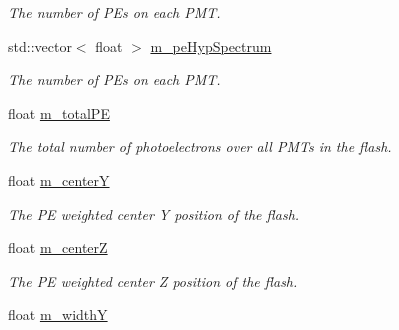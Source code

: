 \begin{DoxyCompactItemize}
\begin{DoxyCompactList}\small\item\em The number of P\-Es on each P\-M\-T. \end{DoxyCompactList}\item 
\hypertarget{classflashmatch_1_1FlashMatchingTool_1_1FlashCandidate_a3ecf14f425f49452494ece572ef97927}{std\-::vector$<$ float $>$ \hyperlink{classflashmatch_1_1FlashMatchingTool_1_1FlashCandidate_a3ecf14f425f49452494ece572ef97927}{m\-\_\-pe\-Hyp\-Spectrum}}\label{classflashmatch_1_1FlashMatchingTool_1_1FlashCandidate_a3ecf14f425f49452494ece572ef97927}

\begin{DoxyCompactList}\small\item\em The number of P\-Es on each P\-M\-T. \end{DoxyCompactList}\item 
\hypertarget{classflashmatch_1_1FlashMatchingTool_1_1FlashCandidate_a5193b7f6862ca08d3dd91a16f2ade309}{float \hyperlink{classflashmatch_1_1FlashMatchingTool_1_1FlashCandidate_a5193b7f6862ca08d3dd91a16f2ade309}{m\-\_\-total\-P\-E}}\label{classflashmatch_1_1FlashMatchingTool_1_1FlashCandidate_a5193b7f6862ca08d3dd91a16f2ade309}

\begin{DoxyCompactList}\small\item\em The total number of photoelectrons over all P\-M\-Ts in the flash. \end{DoxyCompactList}\item 
\hypertarget{classflashmatch_1_1FlashMatchingTool_1_1FlashCandidate_ac75a41fb6afaab35cee4510d76bf6405}{float \hyperlink{classflashmatch_1_1FlashMatchingTool_1_1FlashCandidate_ac75a41fb6afaab35cee4510d76bf6405}{m\-\_\-center\-Y}}\label{classflashmatch_1_1FlashMatchingTool_1_1FlashCandidate_ac75a41fb6afaab35cee4510d76bf6405}

\begin{DoxyCompactList}\small\item\em The P\-E weighted center Y position of the flash. \end{DoxyCompactList}\item 
\hypertarget{classflashmatch_1_1FlashMatchingTool_1_1FlashCandidate_afdc868f23ccd16c5528548163d7ec2a7}{float \hyperlink{classflashmatch_1_1FlashMatchingTool_1_1FlashCandidate_afdc868f23ccd16c5528548163d7ec2a7}{m\-\_\-center\-Z}}\label{classflashmatch_1_1FlashMatchingTool_1_1FlashCandidate_afdc868f23ccd16c5528548163d7ec2a7}

\begin{DoxyCompactList}\small\item\em The P\-E weighted center Z position of the flash. \end{DoxyCompactList}\item 
\hypertarget{classflashmatch_1_1FlashMatchingTool_1_1FlashCandidate_a80fccdaaa6a851437fe16e9c4e855ea3}{float \hyperlink{classflashmatch_1_1FlashMatchingTool_1_1FlashCandidate_a80fccdaaa6a851437fe16e9c4e855ea3}{m\-\_\-width\-Y}}\label{classflashmatch_1_1FlashMatchingTool_1_1FlashCandidate_a80fccdaaa6a851437fe16e9c4e855ea3}


\end{DoxyCompactItemize}
